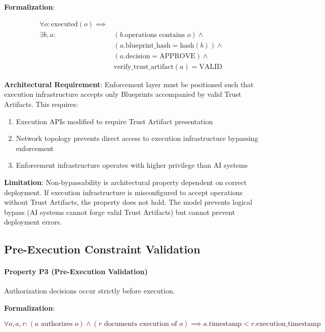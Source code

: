 \documentclass[11pt,letterpaper]{article}
\begin{document}
\textbf{Formalization}:

\begin{equation}
\begin{split}
\forall o: \text{executed}(o) \implies & \\
\exists b, a: & (b.\text{operations contains } o) \land \\
& (a.\text{blueprint\_hash} = \text{hash}(b)) \land \\
& (a.\text{decision} = \text{APPROVE}) \land \\
& \text{verify\_trust\_artifact}(a) = \text{VALID}
\end{split}
\end{equation}

\textbf{Architectural Requirement}: Enforcement layer must be positioned such that execution infrastructure accepts only Blueprints accompanied by valid Trust Artifacts. This requires:

\begin{enumerate}
\item Execution APIs modified to require Trust Artifact presentation
\item Network topology prevents direct access to execution infrastructure bypassing enforcement
\item Enforcement infrastructure operates with higher privilege than AI systems
\end{enumerate}

\textbf{Limitation}: Non-bypassability is architectural property dependent on correct deployment. If execution infrastructure is misconfigured to accept operations without Trust Artifacts, the property does not hold. The model prevents logical bypass (AI systems cannot forge valid Trust Artifacts) but cannot prevent deployment errors.

\subsection{Pre-Execution Constraint Validation}

\paragraph{Property P3 (Pre-Execution Validation)} Authorization decisions occur strictly before execution.

\textbf{Formalization}:

\begin{equation}
\forall o, a, r: (a \text{ authorizes } o) \land (r \text{ documents execution of } o) \implies a.\text{timestamp} < r.\text{execution\_timestamp}
\end{equation}
\end{document}
